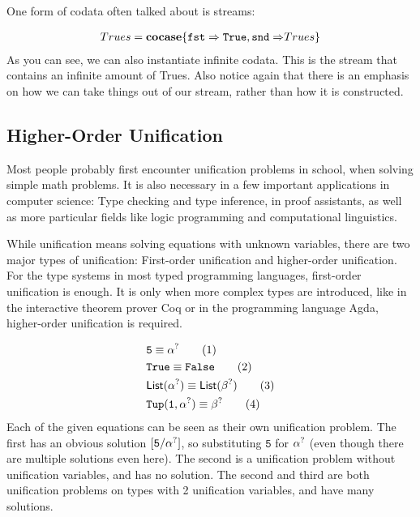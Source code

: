 \documentclass[twoside,12pt,a4paper]{article}
\begin{document}
One form of codata often talked about is streams:
\begin{example}[Streams]
    \begin{align*}
        Trues = \textbf{cocase}\{\mathtt{fst \Rightarrow True, snd \Rightarrow} Trues\}
    \end{align*}
    As you can see, we can also instantiate infinite codata. 
    This is the stream that contains an infinite amount of Trues.
    Also notice again that there is an emphasis on how we can take things out of our stream, rather than how it is constructed.
\end{example}

\subsection{Higher-Order Unification}
Most people probably first encounter unification problems in school, when solving simple math problems.
It is also necessary in a few important applications in computer science: 
Type checking and type inference, in proof assistants, as well as more particular fields like logic programming and computational linguistics.

While unification means solving equations with unknown variables, there are two major types of unification: First-order unification and higher-order unification.
For the type systems in most typed programming languages, first-order unification is enough. It is only when more complex types are introduced, 
like in the interactive theorem prover Coq or in the programming language Agda, higher-order unification is required.

\begin{example}
    \begin{align*}
        &\mathtt{5} \equiv \alpha^?\tag{1}\\
        &\mathtt{True \equiv False}\tag{2}\\
        &\mathsf{List(\alpha^?)\equiv List(\beta^?)}\tag{3}\\
        &\mathtt{Tup(1,\alpha^?)}\equiv \beta^? \tag{4}
    \end{align*}
    Each of the given equations can be seen as their own unification problem.
    The first has an obvious solution $[\mathtt{5/\alpha^?}]$, so substituting $\mathtt{5}$ for $\alpha^?$ (even though there are multiple solutions even here).
    The second is a unification problem without unification variables, and has no solution.
    The second and third are both unification problems on types with 2 unification variables, and have many solutions.
\end{example}
\end{document}
